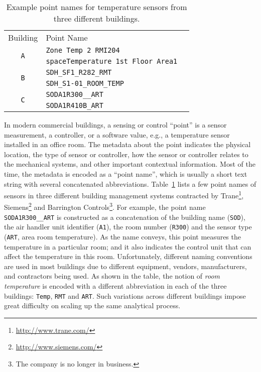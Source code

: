 \begin{table}[h]
\centering
\begin{tabular}{c|ll}
\cline{1-2}
Building & Point Name & \\
\cline{1-2}
\multirow{2}{*}{\texttt{A}}  & \texttt{Zone Temp 2 RMI204} &  \\
					& \texttt{spaceTemperature 1st Floor Area1} &  \\ \cline{1-2}
\multirow{2}{*}{\texttt{B}} & \texttt{SDH\_SF1\_R282\_RMT} &  \\
                     & \texttt{SDH\_S1-01\_ROOM\_TEMP} &  \\ \cline{1-2}
\multirow{2}{*}{\texttt{C}}  & \texttt{SODA1R300\_\_ART} &  \\
					  & \texttt{SODA1R410B\_ART} &  \\ \cline{1-2}
\end{tabular}
\caption{Example point names for temperature sensors from three different buildings.}
\label{table:ex}
\end{table}


In modern commercial buildings, a sensing or control ``point'' is a sensor
measurement, a controller, or a software value, e.g., a temperature sensor
installed in an office room. The metadata about the point indicates the physical
location, the type of sensor or controller, how the sensor or controller relates
to the mechanical systems, and other important contextual information. Most of
the time, the metadata is encoded as a ``point name'', which is usually a short
text string with several concatenated abbreviations. Table~\ref{table:ex} lists 
a few point names of sensors in three different building management systems contracted 
by Trane\footnote{\url{http://www.trane.com/}}, Siemens\footnote{\url{http://www.siemens.com/}} 
and Barrington Controls\footnote{The company is no longer in business.}. 
For example, the point name \texttt{SODA1R300\_\_ART} is constructed as a
concatenation of the building name (\texttt{SOD}), the air handler unit
identifier (\texttt{A1}), the room number (\texttt{R300}) and the sensor type
(\texttt{ART}, area room temperature). As the name conveys, this point measures 
the temperature in a particular room; and it also indicates the control unit that 
can affect the temperature in this room. Unfortunately, different naming conventions 
are used in most buildings due to different equipment, vendors, manufacturers, 
and contractors being used. As shown in the table, the notion of {\em room temperature} is encoded with a different abbreviation in each of the three buildings: \texttt{Temp}, \texttt{RMT} and \texttt{ART}.
Such variations across different buildings impose great difficulty on scaling up the same analytical process.


